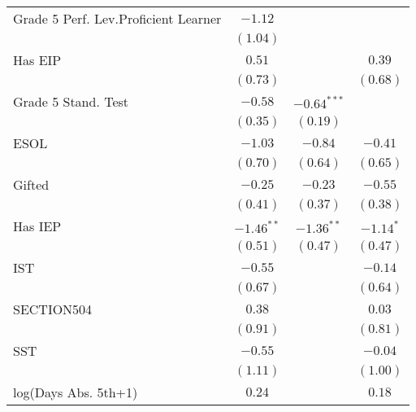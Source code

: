 \begin{center}
\begin{longtable}{l c c c}
Grade 5 Perf. Lev.Proficient Learner               & $-1.12$      &               &              \\
                                                   & $(1.04)$     &               &              \\
Has EIP                                                & $0.51$       &               & $0.39$       \\
                                                   & $(0.73)$     &               & $(0.68)$     \\
Grade 5 Stand. Test                                       & $-0.58$      & $-0.64^{***}$ &              \\
                                                   & $(0.35)$     & $(0.19)$      &              \\
ESOL                                               & $-1.03$      & $-0.84$       & $-0.41$      \\
                                                   & $(0.70)$     & $(0.64)$      & $(0.65)$     \\
Gifted                                             & $-0.25$      & $-0.23$       & $-0.55$      \\
                                                   & $(0.41)$     & $(0.37)$      & $(0.38)$     \\
Has IEP                                                & $-1.46^{**}$ & $-1.36^{**}$  & $-1.14^{*}$  \\
                                                   & $(0.51)$     & $(0.47)$      & $(0.47)$     \\
IST                                                & $-0.55$      &               & $-0.14$      \\
                                                   & $(0.67)$     &               & $(0.64)$     \\
SECTION504                                         & $0.38$       &               & $0.03$       \\
                                                   & $(0.91)$     &               & $(0.81)$     \\
SST                                                & $-0.55$      &               & $-0.04$      \\
                                                   & $(1.11)$     &               & $(1.00)$     \\
log(Days Abs. 5th+1)                                        & $0.24$       &               & $0.18$       \\

\end{longtable}
\end{center}
